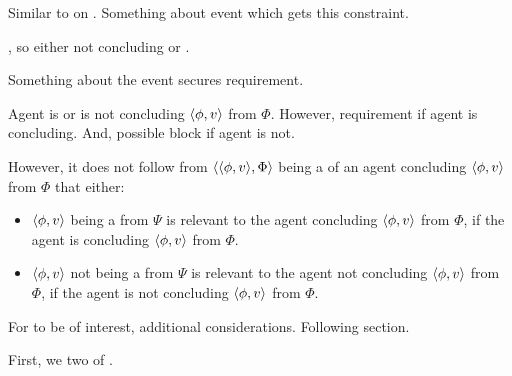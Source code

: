 \begin{note}
  Similar to \qWhyV{} on .
  Something about event which gets this constraint.

  , so either not concluding or \fc{}.

  Something about the event secures requirement.

  Agent is or is not concluding \(\langle \phi, v \rangle\) from \(\Phi\).
  However, requirement if agent is concluding.
  And, possible block if agent is not.

  However, it does not follow from \(\langle \langle \phi, v \rangle, \Phi \rangle\) being a \requ{} of an agent concluding \(\langle \phi, v \rangle\) from \(\Phi\) that either:
  \begin{itemize}
  \item
    \(\langle \phi, v \rangle\) being a \fc{} from \(\Psi\) is relevant to the agent concluding \(\langle \phi, v \rangle\) from \(\Phi\), if the agent is concluding \(\langle \phi, v \rangle\) from \(\Phi\).
  \item
    \(\langle \phi, v \rangle\) not being a \fc{} from \(\Psi\) is relevant to the agent not concluding \(\langle \phi, v \rangle\) from \(\Phi\), if the agent is not concluding \(\langle \phi, v \rangle\) from \(\Phi\).
  \end{itemize}

  For \requ{} to be of interest, additional considerations.
  Following section.

  First, we two  of .
\end{note}

\paragraph*{}

